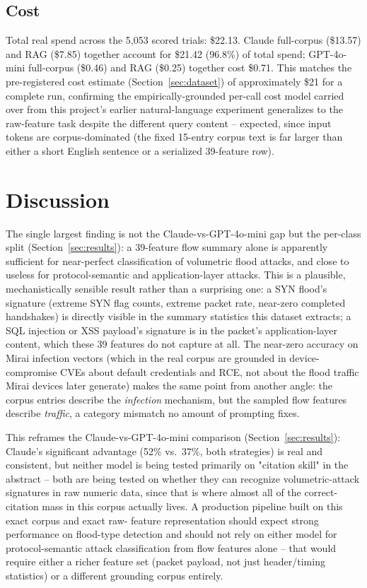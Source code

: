 \documentclass[11pt]{article}
\begin{document}
\subsection{Cost}

Total real spend across the 5{,}053 scored trials: \$22.13. Claude
full-corpus (\$13.57) and RAG (\$7.85) together account for \$21.42
(96.8\%) of total spend; GPT-4o-mini full-corpus (\$0.46) and RAG (\$0.25)
together cost \$0.71. This matches the pre-registered cost estimate
(Section~\ref{sec:dataset}) of approximately \$21 for a complete run,
confirming the empirically-grounded per-call cost model carried over from
this project's earlier natural-language experiment generalizes to the
raw-feature task despite the different query content -- expected, since
input tokens are corpus-dominated (the fixed 15-entry corpus text is far
larger than either a short English sentence or a serialized 39-feature
row).

\section{Discussion}
\label{sec:disc}

The single largest finding is not the Claude-vs-GPT-4o-mini gap but the
per-class split (Section~\ref{sec:results}): a 39-feature flow summary
alone is apparently sufficient for near-perfect classification of
volumetric flood attacks, and close to useless for protocol-semantic and
application-layer attacks. This is a plausible, mechanistically sensible
result rather than a surprising one: a SYN flood's signature (extreme SYN
flag counts, extreme packet rate, near-zero completed handshakes) is
directly visible in the summary statistics this dataset extracts; a SQL
injection or XSS payload's signature is in the packet's application-layer
content, which these 39 features do not capture at all. The near-zero
accuracy on Mirai infection vectors (which in the real corpus are
grounded in device-compromise CVEs about default credentials and RCE, not
about the flood traffic Mirai devices later generate) makes the same point
from another angle: the corpus entries describe the \emph{infection}
mechanism, but the sampled flow features describe \emph{traffic}, a
category mismatch no amount of prompting fixes.

This reframes the Claude-vs-GPT-4o-mini comparison (Section~\ref{sec:results}):
Claude's significant advantage (52\% vs.\ 37\%, both strategies) is real
and consistent, but neither model is being tested primarily on "citation
skill" in the abstract -- both are being tested on whether they can
recognize volumetric-attack signatures in raw numeric data, since that is
where almost all of the correct-citation mass in this corpus actually
lives. A production pipeline built on this exact corpus and exact raw-
feature representation should expect strong performance on flood-type
detection and should not rely on either model for protocol-semantic attack
classification from flow features alone -- that would require either a
richer feature set (packet payload, not just header/timing statistics) or
a different grounding corpus entirely.
\end{document}
